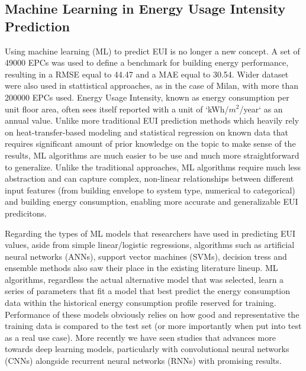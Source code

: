 \documentclass[preprint,12pt]{elsarticle}
\begin{document}
    \subsection{Machine Learning in Energy Usage Intensity Prediction}%
        Using machine learning (ML) to predict EUI is no longer a new concept. A set of 49000 EPCs was used to define a benchmark for building energy performance, resulting in a RMSE equal to 44.47 and a MAE equal to 30.54\cite{piscitelli_interpretable_2025}. Wider dataset were also used in stattistical approaches, as in the case of Milan, with more than 200000 EPCs used\cite{mutani_statistical_2023}. Energy Usage Intensity, known as energy consumption per unit floor area\cite{energystar_energy_2014}, often sees itself reported with a unit of `kWh/$m^2$/year` as an annual value. Unlike more traditional EUI prediction methods which heavily rely on heat-transfer-based modeling and statistical regression on known data that requires significant amount of prior knowledge on the topic to make sense of the results, ML algorithms are much easier to be use and much more straightforward to generalize\cite{amasyali_review_2018}. Unlike the traditional approaches, ML algorithms require much less abstraction and can capture complex, non-linear relationships between different input features (from building envelope to system type, numerical to categorical) and building energy consumption, enabling more accurate and generalizable EUI predicitons\cite{seyedzadeh_machine_2018}. 
        
        Regarding the types of ML models that researchers have used in predicting EUI values, aside from simple linear/logistic regressions, algorithms such as artificial neural networks (ANNs), support vector machines (SVMs), decision tress and ensemble methods\cite{ahmad_building_2016,wang_novel_2018} also saw their place in the existing literature lineup. ML algorithms, regardless the actual alternative model that was selected, learn a series of parameters that fit a model that best predict the energy consumption data within the historical energy consumption profile reserved for training\cite{deb_review_2017}. Performance of these models obviously relies on how good and representative the training data is compared to the test set (or more importantly when put into test as a real use case)\cite{jain_forecasting_2014,touzani_gradient_2018}. More recently we have seen studies that advances more towards deep learning models, particularly with convolutional neural networks (CNNs) alongside recurrent neural networks (RNNs)\cite{fan_short-term_2017,li_buildings_2015} with promising results.
\end{document}
